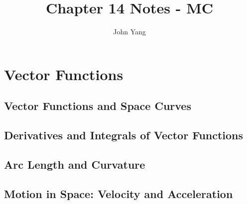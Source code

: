 \documentclass{article}
\title{Chapter 14 Notes - MC} %
\author{John Yang}
\begin{document}
    \maketitle
    \tableofcontents
    \section{Vector Functions} %
    \subsection{Vector Functions and Space Curves} %
    \begin{outline}
        
    \end{outline}
    \subsection{Derivatives and Integrals of Vector Functions}
    \begin{outline}
        
    \end{outline}
    \subsection{Arc Length and Curvature}
    \begin{outline}
        
    \end{outline}
    \subsection{Motion in Space: Velocity and Acceleration}
    \begin{outline}
        
    \end{outline}
\end{document}
